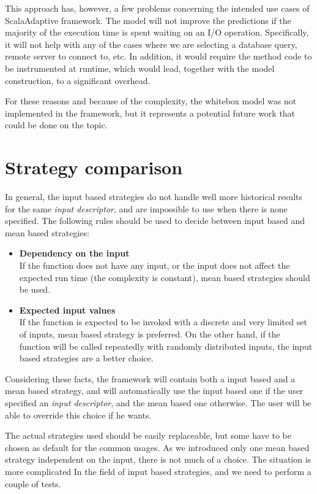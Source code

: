 This approach has, however, a few problems concerning the intended use cases of ScalaAdaptive framework. The model will not improve the predictions if the majority of the execution time is spent waiting on an I/O operation. Specifically, it will not help with any of the cases where we are selecting a database query, remote server to connect to, etc. In addition, it would require the method code to be instrumented at runtime, which would lead, together with the model construction, to a significant overhead.

For these reasons and because of the complexity, the whitebox model was not implemented in the framework, but it represents a potential future work that could be done on the topic.

\section{Strategy comparison}
\label{sec:strategy_comparison}

In general, the input based strategies do not handle well more historical results for the same \textit{input descriptor}, and are impossible to use when there is none specified. The following rules should be used to decide between input based and mean based strategies:

\begin{itemize}
	\item \textbf{Dependency on the input} \\
	If the function does not have any input, or the input does not affect the expected run time (the complexity is constant), mean based strategies should be used.
	\item \textbf{Expected input values} \\
	If the function is expected to be invoked with a discrete and very limited set of inputs, mean based strategy is preferred. On the other hand, if the function will be called repeatedly with randomly distributed inputs, the input based strategies are a better choice.
\end{itemize}

Considering these facts, the framework will contain both a input based and a mean based strategy, and will automatically use the input based one if the user specified an \textit{input descriptor}, and the mean based one otherwise. The user will be able to override this choice if he wants.

The actual strategies used should be easily replaceable, but some have to be chosen as default for the common usages. As we introduced only one mean based strategy independent on the input, there is not much of a choice. The situation is more complicated In the field of input based strategies, and we need to perform a couple of tests.

